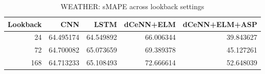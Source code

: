 \begin{table}
\caption{WEATHER: sMAPE across lookback settings}
\begin{tabular}{rrrrr}
\toprule
Lookback & CNN & LSTM & dCeNN+ELM & dCeNN+ELM+ASP \\
\midrule
24 & 64.495174 & 64.549892 & 66.006344 & 39.843627 \\
72 & 64.700082 & 65.073659 & 69.389378 & 45.127261 \\
168 & 64.713233 & 65.108493 & 72.666614 & 52.648039 \\
\bottomrule
\end{tabular}
\end{table}
